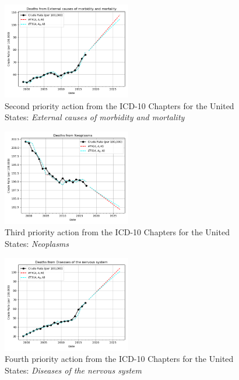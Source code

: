 \documentclass[10pt, a4paper, twocolumn]{IEEEconf}
\begin{document}
\begin{figure}[H]
  \centering
  \includegraphics[width=0.5\textwidth]{results/US_ICD10_CHAPTERS/External_causes_of_morbidity_and_mortality_ets.png}
  \caption{Second priority action from the ICD-10 Chapters for the United States: \textit{External causes of morbidity and mortality}}\label{fig:k5b}
\end{figure}

\begin{figure}[H]
  \centering
  \includegraphics[width=0.5\textwidth]{results/US_ICD10_CHAPTERS/Neoplasms_ets.png}
  \caption{Third priority action from the ICD-10 Chapters for the United States: \textit{Neoplasms}}\label{fig:k5c}
\end{figure}

\begin{figure}[H]
  \centering
  \includegraphics[width=0.5\textwidth]{results/US_ICD10_CHAPTERS/Diseases_of_the_nervous_system_ets.png}
  \caption{Fourth priority action from the ICD-10 Chapters for the United States: \textit{Diseases of the nervous system}}\label{fig:k5d}
\end{figure}
\end{document}
